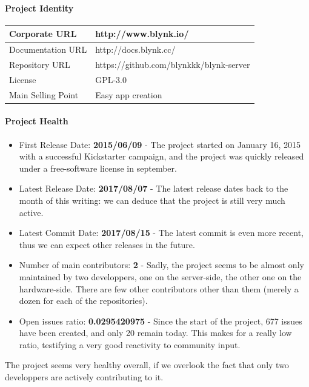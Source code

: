\documentclass{article}
\begin{document}
\paragraph{Project Identity}

\begin{center}
\begin{tabular}{|l|l|}
\hline
Corporate URL & http://www.blynk.io/ \\ \hline
Documentation URL & http://docs.blynk.cc/ \\ \hline
Repository URL & https://github.com/blynkkk/blynk-server \\ \hline
License & GPL-3.0 \\ \hline
Main Selling Point & Easy app creation \\ \hline
\end{tabular}
\end{center}

\paragraph{Project Health}

\begin{itemize}
\item First Release Date: \textbf{2015/06/09} - The project started on January 16, 2015 with a successful Kickstarter campaign, and the project was quickly released under a free-software license in september.
\item Latest Release Date: \textbf{2017/08/07} - The latest release dates back to the month of this writing: we can deduce that the project is still very much active.
\item Latest Commit Date: \textbf{2017/08/15} - The latest commit is even more recent, thus we can expect other releases in the future.
\item Number of main contributors: \textbf{2} - Sadly, the project seems to be almost only maintained by two developpers, one on the server-side, the other one on the hardware-side. There are few other contributors other than them (merely a dozen for each of the repositories).
\item Open issues ratio: \textbf{0.0295420975} - Since the start of the project, 677 issues have been created, and only 20 remain today. This makes for a really low ratio, testifying a very good reactivity to community input.
\end{itemize}

The project seems very healthy overall, if we overlook the fact that only two developpers are  actively contributing to it.
\end{document}
